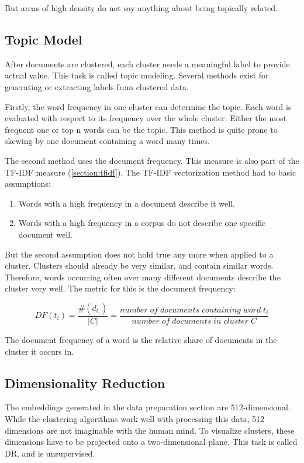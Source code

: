 		But areas of high density do not say anything about being topically related.

		
\subsection{Topic Model}
After documents are clustered, each cluster needs a meaningful label to provide actual value. This task is called topic modeling. Several methods exist for generating or extracting labels from clustered data. 

Firstly, the word frequency in one cluster can determine the topic. Each word is evaluated with respect to its frequency over the whole cluster. Either the most frequent one or top n words can be the topic.
This method is quite prone to skewing by one document containing a word many times.

The second method uses the document frequency. This measure is also part of the \ac{TF-IDF} measure (\ref{section:tfidf}).
The \ac{TF-IDF} vectorization method had to basic assumptions:
\begin{enumerate}
	\item Words with a high frequency in a document describe it well.
	\item Words with a high frequency in a corpus do not describe one specific document well.
\end{enumerate}

But the second assumption does not hold true any more when applied to a cluster. Clusters should already be very similar, and contain similar words. Therefore, words occurring often over many different documents describe the cluster very well. The metric for this is the document frequency:

\[ DF(t_{i}) =\dfrac{\#(d_{t_{i}}) }{|C|} = \dfrac{ number \; of \; documents \; containing \; word \; t_{i}}{number \;  of\;  documents \;  in \; cluster \; C} \]

The document frequency of a word is the relative share of documents in the cluster it occurs in.

\subsection{Dimensionality Reduction}

The embeddings generated in the data preparation section are 512-dimensional. While the clustering algorithms work well with processing this data, 512 dimensions are not imaginable with the human mind. To visualize clusters, these dimensions have to be projected onto a two-dimensional plane. This task is called \ac{DR}, and is unsupervised. 

